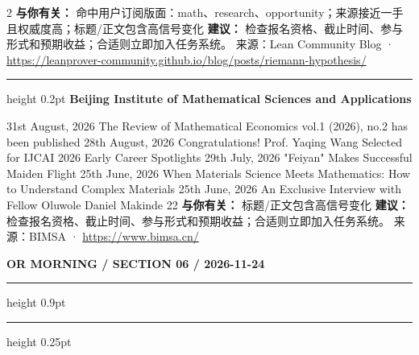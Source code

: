 \documentclass[10.5pt]{ctexart}
\begin{document}
\begin{multicols}{2}
\textbf{与你有关：} 命中用户订阅版面：math、research、opportunity；来源接近一手且权威度高；标题/正文包含高信号变化
\textbf{建议：} 检查报名资格、截止时间、参与形式和预期收益；合适则立即加入任务系统。
{\footnotesize\color{ormuted} 来源：Lean Community Blog · \url{https://leanprover-community.github.io/blog/posts/riemann-hypothesis/}}
\vspace{2mm}
\hrule height 0.2pt
\vspace{2mm}
{\large\bfseries Beijing Institute of Mathematical Sciences and Applications}\par
31st August, 2026 The Review of Mathematical Economics vol.1 (2026), no.2 has been published 28th August, 2026 Congratulations! Prof. Yaqing Wang Selected for IJCAI 2026 Early Career Spotlights 29th July, 2026 "Feiyan" Makes Successful Maiden Flight 25th June, 2026 When Materials Science Meets Mathematics: How to Understand Complex Materials 25th June, 2026 An Exclusive Interview with Fellow Oluwole Daniel Makinde 22
\textbf{与你有关：} 标题/正文包含高信号变化
\textbf{建议：} 检查报名资格、截止时间、参与形式和预期收益；合适则立即加入任务系统。
{\footnotesize\color{ormuted} 来源：BIMSA · \url{https://www.bimsa.cn/}}
\end{multicols}
\newpage
{\small\bfseries OR MORNING / SECTION 06 / 2026-11-24}
\vspace{2mm}
\hrule height 0.9pt
\vspace{1.5mm}
\hrule height 0.25pt
\vspace{4mm}
\end{document}
